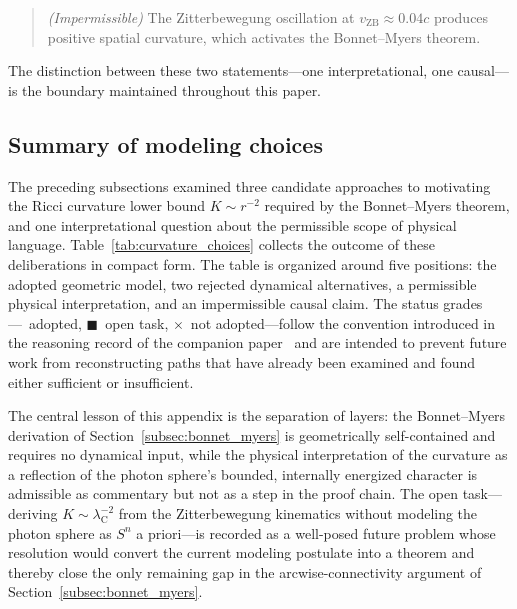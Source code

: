 \documentclass[%
 reprint, amsmath,amssymb, aps, prb, ]{revtex4-2}
\numberwithin{equation}{section}
\newcommand{\lambdaC}{\lambda_{\mathrm{C}}}
\begin{document}
\begin{quote}
\textit{(Impermissible)} The Zitterbewegung oscillation at $v_\mathrm{ZB} \approx 0.04c$ produces positive spatial curvature, which activates the Bonnet--Myers theorem.
\end{quote}

The distinction between these two statements---one interpretational, one causal---is the boundary maintained throughout this paper.

\subsection{Summary of modeling choices}

The preceding subsections examined three candidate approaches to motivating the Ricci curvature lower bound $K \sim r^{-2}$ required by the Bonnet--Myers theorem, and one interpretational question about the permissible scope of physical language. Table~\ref{tab:curvature_choices} collects the outcome of these deliberations in compact form. The table is organized around five positions: the adopted geometric model, two rejected dynamical alternatives, a permissible physical interpretation, and an impermissible causal claim. The status grades---\checkmark\ adopted, $\blacksquare$\ open task, $\times$\ not adopted---follow the convention introduced in the reasoning record of the companion paper~\cite{hanamura50} and are intended to prevent future work from reconstructing paths that have already been examined and found either sufficient or insufficient.

The central lesson of this appendix is the separation of layers: the Bonnet--Myers derivation of Section~\ref{subsec:bonnet_myers} is geometrically self-contained and requires no dynamical input, while the physical interpretation of the curvature as a reflection of the photon sphere's bounded, internally energized character is admissible as commentary but not as a step in the proof chain. The open task---deriving $K \sim \lambdaC^{-2}$ from the Zitterbewegung kinematics without modeling the photon sphere as $S^n$ a priori---is recorded as a well-posed future problem whose resolution would convert the current modeling postulate into a theorem and thereby close the only remaining gap in the arcwise-connectivity argument of Section~\ref{subsec:bonnet_myers}.

\clearpage
\end{document}
